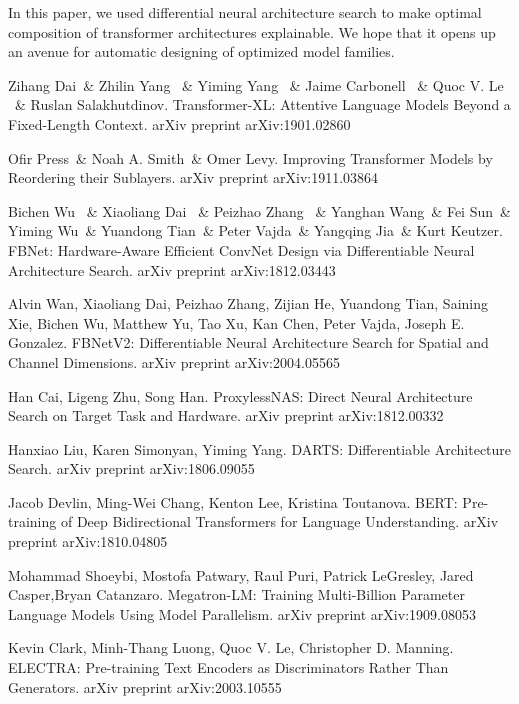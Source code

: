 \documentclass{article}
\begin{document}
In this paper, we used differential neural architecture search to make optimal composition of transformer architectures explainable. We hope that it opens up an avenue for automatic designing of optimized model families.

\begin{thebibliography}{1}

Zihang Dai\ \& Zhilin Yang \ \& Yiming Yang \ \& Jaime Carbonell \ \& Quoc V. Le \ \& Ruslan Salakhutdinov. Transformer-XL: Attentive Language Models Beyond a Fixed-Length Context. arXiv preprint arXiv:1901.02860

Ofir Press\ \& Noah A. Smith\ \& Omer Levy. Improving Transformer Models by Reordering their Sublayers. arXiv preprint arXiv:1911.03864

Bichen Wu \ \& Xiaoliang Dai \ \& Peizhao Zhang \ \& Yanghan Wang\ \& Fei Sun\ \& Yiming Wu\ \& Yuandong Tian\ \& Peter Vajda\ \& Yangqing Jia\ \& Kurt Keutzer.
FBNet: Hardware-Aware Efficient ConvNet Design via Differentiable Neural Architecture Search. arXiv preprint arXiv:1812.03443

Alvin Wan, Xiaoliang Dai, Peizhao Zhang, Zijian He, Yuandong Tian, Saining Xie, Bichen Wu, Matthew Yu, Tao Xu, Kan Chen, Peter Vajda, Joseph E. Gonzalez.
FBNetV2: Differentiable Neural Architecture Search for Spatial and Channel Dimensions. arXiv preprint arXiv:2004.05565

Han Cai, Ligeng Zhu, Song Han.
ProxylessNAS: Direct Neural Architecture Search on Target Task and Hardware. arXiv preprint arXiv:1812.00332

Hanxiao Liu, Karen Simonyan, Yiming Yang.
DARTS: Differentiable Architecture Search. arXiv preprint arXiv:1806.09055

Jacob Devlin, Ming-Wei Chang, Kenton Lee, Kristina Toutanova.
BERT: Pre-training of Deep Bidirectional Transformers for Language Understanding. arXiv preprint arXiv:1810.04805

Mohammad Shoeybi, Mostofa Patwary, Raul Puri, Patrick LeGresley, Jared Casper,Bryan Catanzaro. Megatron-LM: Training Multi-Billion Parameter Language Models Using Model Parallelism. arXiv preprint arXiv:1909.08053

Kevin Clark, Minh-Thang Luong, Quoc V. Le, Christopher D. Manning. ELECTRA: Pre-training Text Encoders as Discriminators Rather Than Generators. arXiv preprint arXiv:2003.10555


\end{thebibliography}
\end{document}
